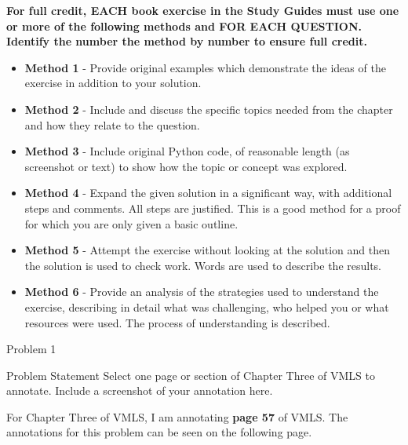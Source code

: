 \textbf{For full credit,  EACH book exercise in the Study Guides must use one or more of the following methods and FOR EACH QUESTION.  Identify the number the method by number to ensure full credit.}

\begin{itemize}
    \item \textbf{Method 1} - Provide original examples which demonstrate the ideas of the exercise in addition to your solution.
    \item \textbf{Method 2} - Include and discuss the specific topics needed from the chapter and how they relate to the question.
    \item \textbf{Method 3} - Include original Python code, of reasonable length (as screenshot or text)  to show how the topic or concept was explored.
    \item \textbf{Method 4} - Expand the given solution in a significant way, with additional steps and comments. All steps are justified. This is a good method for a proof for which you are only given a basic outline.
    \item \textbf{Method 5} - Attempt the exercise without looking at the solution and then the solution is used to check work. Words are used to describe the results.
    \item \textbf{Method 6} - Provide an analysis of the strategies used to understand the exercise, describing in detail what was challenging, who helped you or what resources were used. The process of understanding is
    described.
\end{itemize}

\begin{problem}{Problem 1}
    \begin{statement}{Problem Statement}
        Select one page or section of Chapter Three of VMLS to annotate. Include a screenshot of your annotation here.
    \end{statement}

    For Chapter Three of VMLS, I am annotating \textbf{page 57} of VMLS. The annotations for this problem can be seen on the following page.

    
\end{problem}

